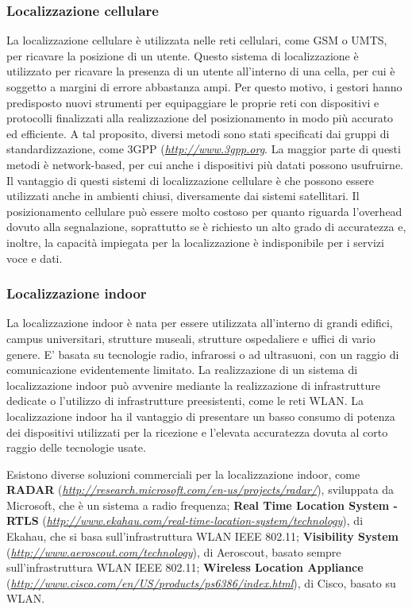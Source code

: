 \subsubsection{Localizzazione cellulare}
La localizzazione cellulare è utilizzata nelle reti cellulari, come GSM o UMTS, per ricavare la posizione di un utente.
Questo sistema di localizzazione è utilizzato per ricavare la presenza di un utente all'interno di una cella, per cui è soggetto a margini di errore abbastanza ampi.
Per questo motivo, i gestori hanno predisposto nuovi strumenti per equipaggiare le proprie reti con dispositivi e protocolli finalizzati alla realizzazione del posizionamento in modo più accurato ed efficiente.
A tal proposito, diversi metodi sono stati specificati dai gruppi di standardizzazione, come 3GPP (\emph{\url{http://www.3gpp.org}}. La maggior parte di questi metodi è network-based, per cui anche i dispositivi più datati possono usufruirne.
Il vantaggio di questi sistemi di localizzazione cellulare è che possono essere utilizzati anche in ambienti chiusi, diversamente dai sistemi satellitari.
Il posizionamento cellulare può essere molto costoso per quanto riguarda l'overhead dovuto alla segnalazione, soprattutto se è richiesto un alto grado  di accuratezza e, inoltre, la capacità impiegata per la localizzazione è indisponibile per i servizi voce e dati.

\subsubsection{Localizzazione indoor}
La localizzazione indoor è nata per essere utilizzata all'interno di grandi edifici, campus universitari, strutture museali, strutture ospedaliere e uffici di vario genere.
E' basata su tecnologie radio, infrarossi o ad ultrasuoni, con un raggio di comunicazione evidentemente limitato.
La realizzazione di un sistema di localizzazione indoor può avvenire mediante la realizzazione di infrastrutture dedicate o l'utilizzo di infrastrutture preesistenti, come le reti WLAN.
La localizzazione indoor ha il vantaggio di presentare un basso consumo di potenza dei dispositivi utilizzati per la ricezione e l'elevata accuratezza dovuta al corto raggio delle tecnologie usate.

Esistono diverse soluzioni commerciali per la localizzazione indoor, come \textbf{RADAR} (\emph{\url{http://research.microsoft.com/en-us/projects/radar/}}), sviluppata da Microsoft, che è un sistema a radio frequenza; \textbf{Real Time Location System - RTLS} (\emph{\url{http://www.ekahau.com/real-time-location-system/technology}}), di Ekahau, che si basa sull'infrastruttura WLAN IEEE 802.11; \textbf{Visibility System} (\emph{\url{http://www.aeroscout.com/technology}}), di Aeroscout, basato sempre sull'infrastruttura WLAN IEEE 802.11; \textbf{Wireless Location Appliance} (\emph{\url{http://www.cisco.com/en/US/products/ps6386/index.html}}), di Cisco, basato su WLAN.

